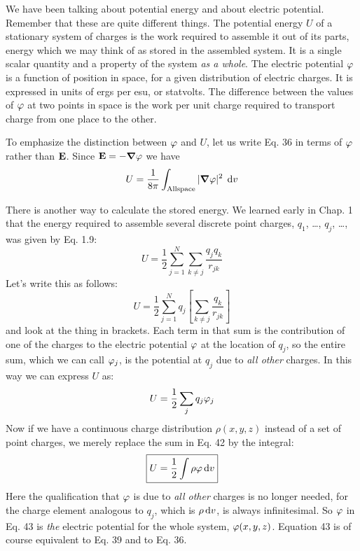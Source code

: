 We have been talking about potential energy and about electric
potential. Remember that these are quite different things. The potential
energy $U$ of a stationary system of charges is the work required
to assemble it out of its parts, energy which we may think of as stored
in the assembled system. It is a single scalar quantity and a property
of the system \emph{as a whole}. The electric potential $\varphi$ is a function of
position in space, for a given distribution of electric charges. It is
expressed in units of ergs per esu, or statvolts. The difference between
the values of $\varphi$ at two points in space is the work per unit
charge required to transport charge from one place to the other.

To emphasize the distinction between $\varphi$ and $U$, let us write Eq. 36
in terms of $\varphi$ rather than $\mathbf{E}$. Since $\mathbf{E} = -\boldsymbol{\nabla}\varphi$ we have
\begin{equation}
  U = \frac{1}{8\pi}\int_\text{All\\space} |\boldsymbol{\nabla}\varphi|^2\;\operatorname{d\!} v
\end{equation}

There is another way to calculate the stored energy. We learned
early in Chap. 1 that the energy required to assemble several discrete
point charges, $q_1$, \ldots , $q_j$, \ldots , was given by Eq. 1.9:
\begin{equation}
  U = \frac{1}{2} \sum_{j=1}^N \sum_{k\ne j} \frac{q_jq_k}{r_{jk}}
\end{equation}
Let's write this as follows:
\begin{equation}
  U = \frac{1}{2} \sum_{j=1}^N q_j \left[\sum_{k\ne j} \frac{q_k}{r_{jk}}\right]
\end{equation}
and look at the thing in brackets. Each term in that sum is the contribution
of one of the charges to the electric potential $\varphi$ at the location
of $q_j$, so the entire sum, which we can call $\varphi_j$, is the potential at
$q_j$ due to \emph{all other} charges. In this way we can express $U$ as:
\begin{equation}
  U = \frac{1}{2}\sum_j q_j\varphi_j
\end{equation}
Now if we have a continuous charge distribution $\rho(x,y,z)$ instead of
a set of point charges, we merely replace the sum in Eq. 42 by the
integral:
\begin{equation}
\boxed{
  U = \frac{1}{2}\int \rho \varphi \operatorname{d\!} v  
}
\end{equation}
Here the qualification that $\varphi$ is due to \emph{all other} charges is no longer
needed, for the charge element analogous to $q_j$, which is $\rho\operatorname{d\!} v$, is
always infinitesimal. So $\varphi$ in Eq. 43 is \emph{the} electric potential for the
whole system, $\varphi(x,y,z)$. Equation 43 is of course equivalent to
Eq. 39 and to Eq. 36.

